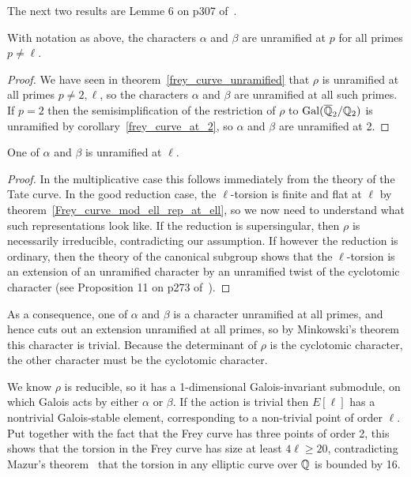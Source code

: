  The next two results are Lemme 6 on p307 of~\cite{serrepropgal}.

\begin{theorem}\label{Frey_characters_are_unramified} With notation as above, the characters
  $\alpha$ and $\beta$ are unramified at $p$ for all primes $p\not=\ell$.
\end{theorem}
\begin{proof} We have seen in theorem~\ref{frey_curve_unramified} that $\rho$ is unramified at all 
  primes $p\not=2,\ell$, so the
  characters $\alpha$ and $\beta$ are unramified at all such primes. If $p=2$ then the
  semisimplification of the restriction of $\rho$ to $\operatorname{Gal}(\overline{\mathbb{Q}}_2/\mathbb{Q}_2)$ is unramified
  by corollary~\ref{frey_curve_at_2}, so $\alpha$ and $\beta$ are unramified at 2.
\end{proof}

\begin{theorem}\label{Frey_characters_at_ell} One of $\alpha$ and $\beta$ is unramified at $\ell$.
\end{theorem}
\begin{proof}
In the multiplicative case this follows immediately from the theory of the Tate curve.
In the good reduction case, the $\ell$-torsion is finite and flat at $\ell$ by theorem~\ref{Frey_curve_mod_ell_rep_at_ell}, so we now need to understand what such representations
look like. If the reduction is supersingular, then $\rho$ is necessarily irreducible,
contradicting our assumption. If however the reduction is ordinary, then the theory of the
canonical subgroup shows that the $\ell$-torsion is an extension of an unramified character by
an unramified twist of the cyclotomic character (see Proposition 11 on p273 of~\cite{serrepropgal}).
\end{proof}

As a consequence, one of $\alpha$ and $\beta$ is a character unramified at all primes, and hence
cuts out an extension unramified at all primes, so by Minkowski's theorem this character
is trivial. Because the determinant of $\rho$ is the cyclotomic character, the other character
must be the cyclotomic character.

We know $\rho$ is reducible, so it has a 1-dimensional Galois-invariant submodule, on which
Galois acts by either $\alpha$ or $\beta$. If the action is trivial then $E[\ell]$ has a 
nontrivial Galois-stable element, corresponding to a non-trivial point of order $\ell$.
Put together with the fact that the Frey curve has three points of order 2, this shows
that the torsion in the Frey curve has size at least $4\ell\geq20$, contradicting 
Mazur's theorem~\cite{mazur} that the torsion in any elliptic curve over $\mathbb{Q}$ is bounded
by 16.

